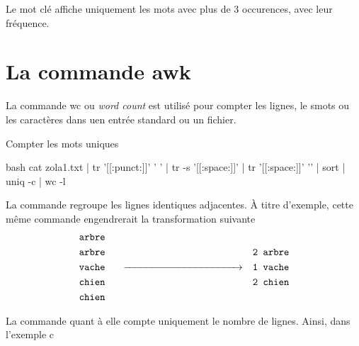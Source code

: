 \documentclass[a4paper, 14pt]{report}
\begin{document}
    Le mot clé 
    affiche uniquement les mots avec plus de 3 occurences, avec leur 
    fréquence. 


    \section{La commande awk}
    \begin{Définition}
        La commande wc ou \textit{word count} est utilisé 
        pour compter les lignes, le smots ou les caractères dans uen entrée 
        standard ou un fichier. 
    \end{Définition}

    \vspace{1em}
    \begin{Exemple}{Compter les mots uniques}
        \begin{center}
            \begin{adjustbox}{max width=\linewidth}
                \begin{cminted}{bash}
cat zola1.txt | tr      '[[:punct:]]' ' ' 
              | tr   -s '[[:space:]]' 
              | tr      '[[:space:]]' '\n' 
              | sort  
              | uniq -c 
              | wc   -l
                \end{cminted}
            \end{adjustbox}
        \end{center}
    \end{Exemple}

    La commande  
    regroupe les lignes identiques adjacentes. À titre 
    d'exemple, cette même commande engendrerait la transformation suivante 
        \begin{align*}
            &\texttt{arbre} \quad \phantom{\xrightarrow{\hspace*{3cm}}} &
            \\
            &\texttt{arbre} \quad \phantom{\xrightarrow{\hspace*{3cm}}}  &\texttt{2 arbre}
            \\
            &\texttt{vache} \;\;\quad \xrightarrow{\hspace*{4cm}} &\texttt{1 vache}
            \\
            &\texttt{chien} \quad \phantom{\xrightarrow{\hspace*{3cm}}} &\texttt{2 chien}
            \\
            &\texttt{chien} \quad \phantom{\xrightarrow{\hspace*{3cm}}} &
        \end{align*}

        La commande  quant à elle 
    compte uniquement le nombre de lignes. Ainsi, dans l'exemple c







                                                                                    
    
\end{document}
